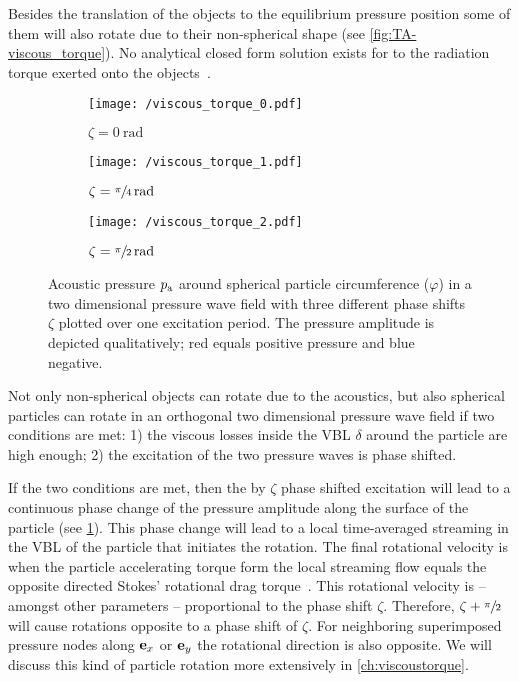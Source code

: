 Besides the translation of the objects to the equilibrium pressure position 
some of them will also rotate due to their non-spherical shape (see 
\cref{fig:TA-viscous_torque}). No analytical closed form solution exists for to 
the radiation torque exerted onto the objects~\cite{Lamprecht2017}.

 \begin{figure}
  \centering
  \begin{subfigure}[b]{0.35\textwidth}
    \centering
    \caption{$\zeta = \SI{0}{\radian}$}
    \texttt{[image: /viscous\_torque\_0.pdf]}
  \end{subfigure}
  \hfill
  \begin{subfigure}[b]{0.3\textwidth}
    \centering
    \caption{$\zeta = \sfrac{\pi}{4}\,\si{\radian}$}
    \texttt{[image: /viscous\_torque\_1.pdf]}
  \end{subfigure}
  \hfill
  \begin{subfigure}[b]{0.3\textwidth}
    \centering
    \caption{$\zeta = \sfrac{\pi}{2}\,\si{\radian}$}
    \texttt{[image: /viscous\_torque\_2.pdf]}
  \end{subfigure}
  \caption{Acoustic pressure $p_{\mathrm{a}}$ around spherical particle 
      circumference ($\varphi$) in a two dimensional pressure wave field with 
      three different phase shifts $\zeta$ plotted over one excitation period. 
      The pressure amplitude is depicted qualitatively; red equals positive 
  pressure and blue negative.}
  \label{fig:TA-VT}
 \end{figure}

Not only non-spherical objects can rotate due to the acoustics, but also 
spherical particles can rotate in an orthogonal two dimensional pressure wave 
field if two conditions are met: 1) the viscous losses inside the VBL $\delta$ 
around the particle are high enough; 2) the excitation of the two pressure 
waves is phase shifted.

If the two conditions are met, then the by $\zeta$ phase shifted excitation 
will lead to a continuous phase change of the pressure amplitude along the 
surface of the particle (see \cref{fig:TA-VT}). This phase change will lead to 
a local time-averaged streaming in the VBL of the particle that initiates the 
rotation. The final rotational velocity is when the particle accelerating 
torque form the local streaming flow equals the opposite directed Stokes' 
rotational drag torque~\cite{Lamprecht2017}. This rotational velocity is -- 
amongst other parameters -- proportional to the phase shift $\zeta$. Therefore, 
$\zeta + \sfrac{\pi}{2}$ will cause rotations opposite to a phase shift of 
$\zeta$. For neighboring superimposed pressure nodes along $\vb{e}_{x}$ or $\vb{e}_{y}$ the 
rotational direction is also opposite. We will discuss this kind of particle 
rotation more extensively in \cref{ch:viscoustorque}.

